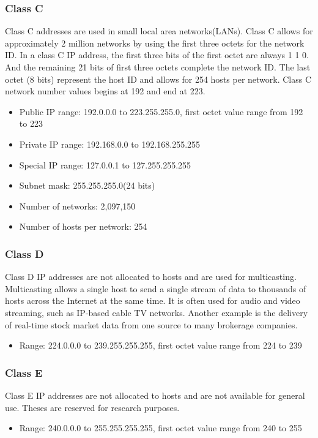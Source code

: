 \subsubsection{Class C}
Class C addresses are used in small local area networks(LANs). Class C
allows for approximately 2 million networks by using the first three
octets for the network ID. In a class C IP address, the first three bits
of the first octet are always 1 1 0. And the remaining 21 bits of first
three octets complete the network ID. The last octet (8 bits) represent
the host ID and allows for 254 hosts per network. Class C network number
values begins at 192 and end at 223.
\begin{itemize}
    \item Public IP range: 192.0.0.0 to 223.255.255.0, first octet value
        range from 192 to 223
    \item Private IP range: 192.168.0.0 to 192.168.255.255
    \item Special IP range: 127.0.0.1 to 127.255.255.255
    \item Subnet mask: 255.255.255.0(24 bits)
    \item Number of networks: 2,097,150
    \item Number of hosts per network: 254
\end{itemize}

\subsubsection{Class D}
Class D IP addresses are not allocated to hosts and are used for
multicasting. Multicasting allows a single host to send a single stream
of data to thousands of hosts across the Internet at the same time. It
is often used for audio and video streaming, such as IP-based cable TV
networks. Another example is the delivery of real-time stock market data
from one source to many brokerage companies.
\begin{itemize}
    \item Range: 224.0.0.0 to 239.255.255.255, first octet value range
        from 224 to 239
\end{itemize}

\subsubsection{Class E}
Class E IP addresses are not allocated to hosts and are not available
for general use. Theses are reserved for research purposes.
\begin{itemize}
    \item Range: 240.0.0.0 to 255.255.255.255, first octet value range
        from 240 to 255
\end{itemize}


